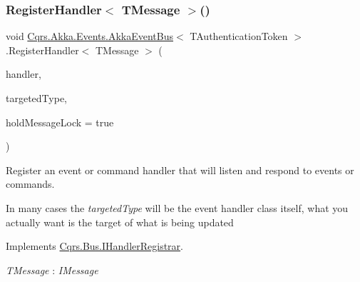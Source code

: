 \subsubsection{\texorpdfstring{Register\+Handler$<$ T\+Message $>$()}{RegisterHandler< TMessage >()}\hspace{0.1cm}{\footnotesize\ttfamily [1/2]}}
{\footnotesize\ttfamily void \hyperlink{classCqrs_1_1Akka_1_1Events_1_1AkkaEventBus}{Cqrs.\+Akka.\+Events.\+Akka\+Event\+Bus}$<$ T\+Authentication\+Token $>$.Register\+Handler$<$ T\+Message $>$ (\begin{DoxyParamCaption}\item[{Action$<$ T\+Message $>$}]{handler,  }\item[{Type}]{targeted\+Type,  }\item[{bool}]{hold\+Message\+Lock = {\ttfamily true} }\end{DoxyParamCaption})}



Register an event or command handler that will listen and respond to events or commands. 

In many cases the {\itshape targeted\+Type}  will be the event handler class itself, what you actually want is the target of what is being updated 

Implements \hyperlink{interfaceCqrs_1_1Bus_1_1IHandlerRegistrar_ab6ca4dfdc54a5aeebe4651dbdb479f55_ab6ca4dfdc54a5aeebe4651dbdb479f55}{Cqrs.\+Bus.\+I\+Handler\+Registrar}.

\begin{Desc}
\item[Type Constraints]\begin{description}
\item[{\em T\+Message} : {\em I\+Message}]\end{description}
\end{Desc}
\mbox{\label{classCqrs_1_1Akka_1_1Events_1_1AkkaEventBus_a6795dfcaf611ce1b50310f442cef0546_a6795dfcaf611ce1b50310f442cef0546}} 
